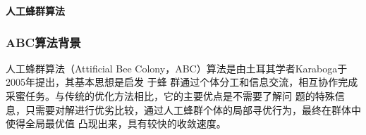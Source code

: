 \begin{frame}
\newcommand{\song}{\setCJKfamilyfont{song}}
\newcommand{\xiaoer}{\fontsize{18pt}{18pt}\selectfont}
	\begin{center}
	{\song\xiaoer\textbf{人工蜂群算法}}
	\end{center}
\end{frame}

\begin{frame}
  \frametitle{ABC算法背景}
	\qquad 人工蜂群算法（Attificial Bee Colony，ABC）算法是由土耳其学者Karaboga于2005年提出，其基本思想是启发 	 	于蜂	群通过个体分工和信息交流，相互协作完成采蜜任务。与传统的优化方法相比，它的主要优点是不需要了解问    	题的特殊信息，只需要对解进行优劣比较，通过人工蜂群个体的局部寻优行为，最终在群体中使得全局最优值	 	凸现出来，具有较快的收敛速度。
\end{frame}

